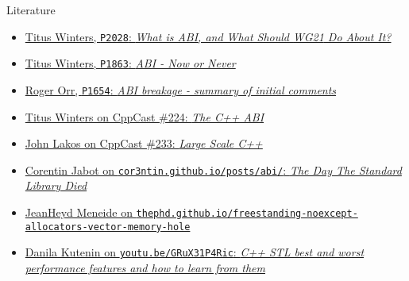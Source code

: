 \begin{frame}{Literature}
    \begin{itemize}
        \item \href{http://www.open-std.org/jtc1/sc22/wg21/docs/papers/2020/p2028r0.pdf}{Titus Winters, \texttt{P2028}: \textit{What is ABI, and What Should \href{http://www.open-std.org/jtc1/sc22/wg21/}{WG21} Do About It?}}
        \item \href{http://www.open-std.org/jtc1/sc22/wg21/docs/papers/2020/p1863r1.pdf}{Titus Winters, \texttt{P1863}: \textit{ABI - Now or Never}}
        \item \href{http://open-std.org/JTC1/SC22/WG21/docs/papers/2020/p1654r1.html}{Roger Orr, \texttt{P1654}: \textit{ABI breakage - summary of initial comments}}
        \item \href{https://cppcast.com/titus-winters-abi/}{Titus Winters on CppCast \#224: \textit{The C++ ABI}}
        \item \href{https://cppcast.com/john-lakos-large-scale-cpp/}{John Lakos on CppCast \#233: \textit{Large Scale C++}}
        \item \href{https://cor3ntin.github.io/posts/abi/}{Corentin Jabot on \texttt{cor3ntin.github.io/posts/abi/}: \textit{The Day The Standard Library Died}}
        \item \href{https://thephd.github.io/freestanding-noexcept-allocators-vector-memory-hole}{JeanHeyd Meneide on \texttt{thephd.github.io/freestanding-noexcept-allocators-vector-memory-hole}}
        \item \href{https://youtu.be/GRuX31P4Ric}{Danila Kutenin on \texttt{youtu.be/GRuX31P4Ric}: \textit{C++ STL best and worst performance features and how to learn from them}}
    \end{itemize}
\end{frame}
